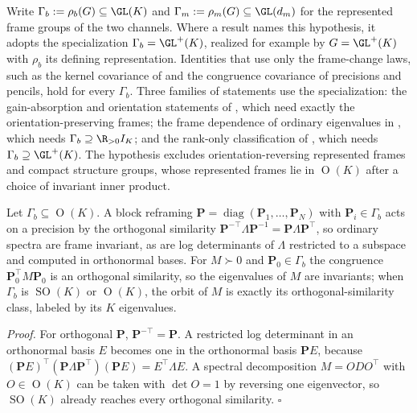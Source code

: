 Write \(\Gamma_b:=\rho_b(G)\subseteq\GL(K)\) and
\(\Gamma_m:=\rho_m(G)\subseteq\GL(d_m)\) for the represented frame groups of
the two channels. Where a result names this hypothesis, it adopts the
specialization \(\Gamma_b=\GL^+(K)\), realized for example by
\(G=\GL^+(K)\) with \(\rho_b\) its defining representation. Identities that
use only the frame-change laws, such as the kernel covariance of
 and the congruence covariance of
precisions and pencils, hold for every \(\Gamma_b\). Three families of
statements use the specialization: the gain-absorption and orientation
statements of , which need exactly the
orientation-preserving frames; the frame dependence of ordinary eigenvalues in
, which needs \(\Gamma_b\supseteq\R_{>0}I_K\); and the
rank-only classification of , which needs
\(\Gamma_b\supseteq\GL^+(K)\). The hypothesis excludes orientation-reversing
represented frames and compact structure groups, whose represented frames lie
in \(\operatorname{O}(K)\) after a choice of invariant inner product.

Let \(\Gamma_b\subseteq\operatorname{O}(K)\). A block reframing
\(\mathbf P=\operatorname{diag}(\mathbf P_1,\dots,\mathbf P_N)\) with \(\mathbf P_i\in\Gamma_b\) acts on a
precision by the orthogonal similarity \(\mathbf P^{-\top}\Lambda\mathbf P^{-1}=\mathbf P\Lambda\mathbf P^\top\),
so ordinary spectra are frame invariant, as are log determinants of
\(\Lambda\) restricted to a subspace and computed in orthonormal bases. For
\(M\succ0\) and \(\mathbf P_0\in\Gamma_b\) the congruence \(\mathbf P_0^\top M\mathbf P_0\) is an
orthogonal similarity, so the eigenvalues of \(M\) are invariants; when
\(\Gamma_b\) is \(\operatorname{SO}(K)\) or \(\operatorname{O}(K)\), the orbit
of \(M\) is exactly its orthogonal-similarity class, labeled by its \(K\)
eigenvalues. 

\noindent\emph{Proof.}
For orthogonal \(\mathbf P\), \(\mathbf P^{-\top}=\mathbf P\). A restricted log determinant in an
orthonormal basis \(E\) becomes one in the orthonormal basis \(\mathbf PE\), because
\((\mathbf PE)^\top(\mathbf P\Lambda\mathbf P^\top)(\mathbf PE)=E^\top\Lambda E\). A
spectral decomposition \(M=ODO^\top\) with \(O\in\operatorname{O}(K)\) can be
taken with \(\det O=1\) by reversing one eigenvector, so \(\operatorname{SO}(K)\)
already reaches every orthogonal similarity. \(\square\)

